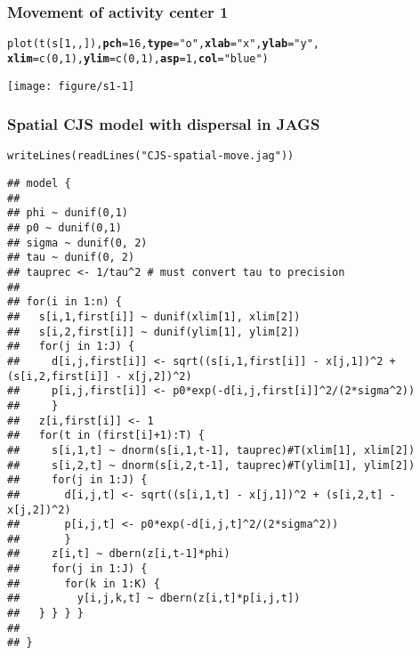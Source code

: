 \documentclass[color=usenames,dvipsnames]{beamer}\usepackage[]{graphicx}\usepackage[]{color}
\makeatletter
\newcommand{\hlnum}[1]{\textcolor[rgb]{0.69,0.494,0}{#1}}%
\newcommand{\hlstr}[1]{\textcolor[rgb]{0.749,0.012,0.012}{#1}}%
\newcommand{\hlstd}[1]{\textcolor[rgb]{0,0,0}{#1}}%
\newcommand{\hlkwc}[1]{\textcolor[rgb]{0,0,0}{\textbf{#1}}}%
\newcommand{\hlkwd}[1]{\textcolor[rgb]{0.004,0.004,0.506}{#1}}%
\newenvironment{kframe}{%
 \def\at@end@of@kframe{}%
 \ifinner\ifhmode%
  \def\at@end@of@kframe{\end{minipage}}%
  \begin{minipage}{\columnwidth}%
 \fi\fi%
 \def\FrameCommand##1{\hskip\@totalleftmargin \hskip-\fboxsep
 \colorbox{shadecolor}{##1}\hskip-\fboxsep
     \hskip-\linewidth \hskip-\@totalleftmargin \hskip\columnwidth}%
 \MakeFramed {\advance\hsize-\width
   \@totalleftmargin\z@ \linewidth\hsize
   \@setminipage}}%
 {\par\unskip\endMakeFramed%
 \at@end@of@kframe}
\newenvironment{knitrout}{}{} %
\makeatother
\begin{document}
\begin{frame}[fragile]
  \frametitle{Movement of activity center 1}
\begin{knitrout}\scriptsize
{}\color{fgcolor}\begin{kframe}
\begin{alltt}
\hlkwd{plot}\hlstd{(}\hlkwd{t}\hlstd{(s[}\hlnum{1}\hlstd{,,]),} \hlkwc{pch}\hlstd{=}\hlnum{16}\hlstd{,} \hlkwc{type}\hlstd{=}\hlstr{"o"}\hlstd{,} \hlkwc{xlab}\hlstd{=}\hlstr{"x"}\hlstd{,} \hlkwc{ylab}\hlstd{=}\hlstr{"y"}\hlstd{,}
     \hlkwc{xlim}\hlstd{=}\hlkwd{c}\hlstd{(}\hlnum{0}\hlstd{,} \hlnum{1}\hlstd{),} \hlkwc{ylim}\hlstd{=}\hlkwd{c}\hlstd{(}\hlnum{0}\hlstd{,} \hlnum{1}\hlstd{),} \hlkwc{asp}\hlstd{=}\hlnum{1}\hlstd{,} \hlkwc{col}\hlstd{=}\hlstr{"blue"}\hlstd{)}
\end{alltt}
\end{kframe}

{\centering \texttt{[image: figure/s1-1]} 

}


\end{knitrout}
\end{frame}




\begin{frame}[fragile]
  \frametitle{Spatial CJS model with dispersal in JAGS}
  \vspace{-2mm}
  \tiny %
\begin{knitrout}\tiny
{}\color{fgcolor}\begin{kframe}
\begin{alltt}
\hlkwd{writeLines}\hlstd{(}\hlkwd{readLines}\hlstd{(}\hlstr{"CJS-spatial-move.jag"}\hlstd{))}
\end{alltt}
\begin{verbatim}
## model {
## 
## phi ~ dunif(0,1)
## p0 ~ dunif(0,1)
## sigma ~ dunif(0, 2)
## tau ~ dunif(0, 2)
## tauprec <- 1/tau^2 # must convert tau to precision
## 
## for(i in 1:n) {
##   s[i,1,first[i]] ~ dunif(xlim[1], xlim[2])
##   s[i,2,first[i]] ~ dunif(ylim[1], ylim[2])
##   for(j in 1:J) {
##     d[i,j,first[i]] <- sqrt((s[i,1,first[i]] - x[j,1])^2 + (s[i,2,first[i]] - x[j,2])^2)
##     p[i,j,first[i]] <- p0*exp(-d[i,j,first[i]]^2/(2*sigma^2))
##     }
##   z[i,first[i]] <- 1
##   for(t in (first[i]+1):T) {
##     s[i,1,t] ~ dnorm(s[i,1,t-1], tauprec)#T(xlim[1], xlim[2])
##     s[i,2,t] ~ dnorm(s[i,2,t-1], tauprec)#T(ylim[1], ylim[2])
##     for(j in 1:J) {
##       d[i,j,t] <- sqrt((s[i,1,t] - x[j,1])^2 + (s[i,2,t] - x[j,2])^2)
##       p[i,j,t] <- p0*exp(-d[i,j,t]^2/(2*sigma^2))
##       }
##     z[i,t] ~ dbern(z[i,t-1]*phi)
##     for(j in 1:J) {
##       for(k in 1:K) {
##         y[i,j,k,t] ~ dbern(z[i,t]*p[i,j,t])
##   } } } }
## 
## }
\end{verbatim}
\end{kframe}
\end{knitrout}
\end{frame}
\end{document}
